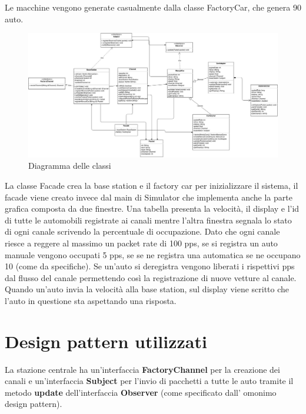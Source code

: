 \documentclass[a4paper,10pt]{article}
\begin{document}
Le macchine vengono generate casualmente dalla classe FactoryCar, che genera 90 auto. 


\begin{figure}[htbp]
\includegraphics[scale=0.24]{class_diagram.jpg}
\caption{Diagramma delle classi}
\label{class_dig}
\end{figure}


La classe Facade crea la base station e il factory car per inizializzare il sistema, il facade viene creato invece dal main di Simulator che implementa anche la parte grafica composta da due finestre.
Una tabella presenta la velocità, il display e l'id di tutte le automobili registrate ai canali mentre l'altra finestra segnala lo stato di ogni canale scrivendo la percentuale di occupazione. Dato che ogni canale riesce a reggere al massimo un packet rate di 100 pps, se si registra un auto manuale vengono occupati 5 pps, se se ne registra una automatica se ne occupano 10 (come da specifiche). 
Se un'auto si deregistra vengono liberati i rispettivi pps dal flusso del canale permettendo così la registrazione di nuove vetture al canale.
Quando un'auto invia la velocità alla base station, sul display viene scritto che l'auto in questione sta aspettando una risposta. 

\section{Design pattern utilizzati}

La stazione centrale ha un'interfaccia \textbf{FactoryChannel} per la creazione dei canali e un'interfaccia \textbf{Subject} per l'invio di pacchetti a tutte le auto tramite il metodo \textbf{update} dell'interfaccia \textbf{Observer} (come specificato dall' omonimo design pattern). 
\end{document}

